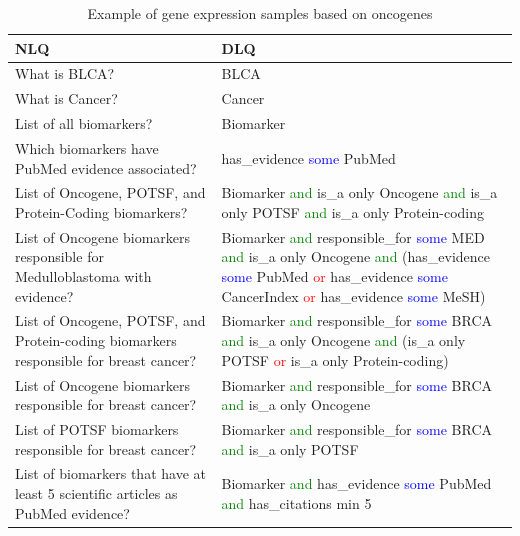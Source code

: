 \iffalse
\begin{table}
    \caption{Example of gene expression samples based on oncogenes}
    \label{table:nlq_dlq}
    \vspace{-6mm}
    \begin{center}
        \scriptsize
        \begin{tabular}{l|l}
            \hline
            \rowcolor{Gray}
            \textbf{NLQ} & \textbf{DLQ} \\\hline  
                What is BLCA? & BLCA \\\hline
                What is Cancer? & Cancer \\\hline
                List of all biomarkers? & Biomarker \\\hline
                Which biomarkers have PubMed evidence associated? & has\_evidence \textcolor{blue}{some} PubMed \\\hline
                List of Oncogene, POTSF, and Protein-Coding biomarkers? & Biomarker \textcolor{green}{and} is\_a only Oncogene \textcolor{green}{and} is\_a only POTSF \textcolor{green}{and} is\_a only Protein-coding \\\hline
                List of Oncogene biomarkers responsible for Medulloblastoma with evidence? & Biomarker \textcolor{green}{and} responsible\_for \textcolor{blue}{some} MED \textcolor{green}{and} is\_a only Oncogene \textcolor{green}{and} (has\_evidence \textcolor{blue}{some} PubMed \textcolor{red}{or} has\_evidence \textcolor{blue}{some} CancerIndex \textcolor{red}{or} has\_evidence \textcolor{blue}{some} MeSH) \\\hline
                List of Oncogene, POTSF, and Protein-coding biomarkers responsible for breast cancer? & Biomarker \textcolor{green}{and} responsible\_for \textcolor{blue}{some} BRCA \textcolor{green}{and} is\_a only Oncogene \textcolor{green}{and} (is\_a only POTSF \textcolor{red}{or} is\_a only Protein-coding) \\\hline                
                List of Oncogene biomarkers responsible for breast cancer? & Biomarker \textcolor{green}{and} responsible\_for \textcolor{blue}{some} BRCA \textcolor{green}{and} is\_a only Oncogene \\\hline
                List of POTSF biomarkers responsible for breast cancer? & Biomarker \textcolor{green}{and} responsible\_for \textcolor{blue}{some} BRCA \textcolor{green}{and} is\_a only POTSF \\\hline
                List of biomarkers that have at least 5 scientific articles as PubMed evidence? & Biomarker \textcolor{green}{and} has\_evidence \textcolor{blue}{some} PubMed \textcolor{green}{and} has\_citations min 5 \\\hline

\end{tabular}
\end{center}
\end{table}
